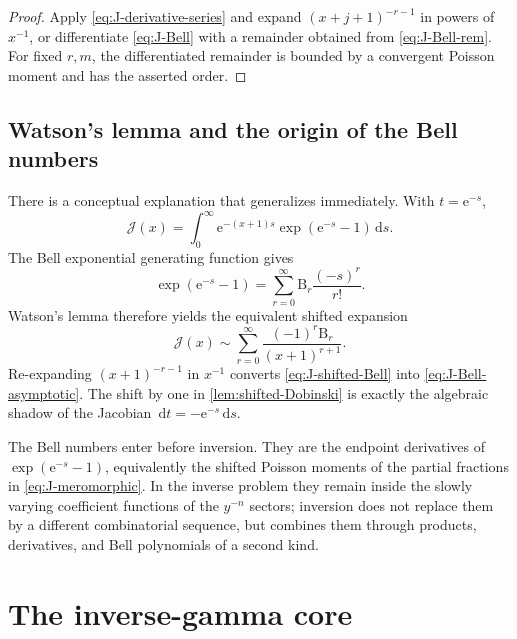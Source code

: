 \documentclass[11pt,a4paper]{article}
\numberwithin{equation}{section}
\theoremstyle{definition}
\theoremstyle{remark}
\newcommand{\e}{\mathrm e}
\newcommand{\dd}{\,\mathrm d}
\newcommand{\Bell}{\mathrm B}
\newcommand{\Tail}{\mathcal J}
\begin{document}
\begin{proof}
Apply \eqref{eq:J-derivative-series} and expand
$(x+j+1)^{-r-1}$ in powers of $x^{-1}$, or differentiate
\eqref{eq:J-Bell} with a remainder obtained from
\eqref{eq:J-Bell-rem}.  For fixed $r,m$, the differentiated remainder is
bounded by a convergent Poisson moment and has the asserted order.
\end{proof}

\subsection{Watson's lemma and the origin of the Bell numbers}

There is a conceptual explanation that generalizes immediately.  With
$t=\e^{-s}$,
\begin{equation}\label{eq:J-Laplace}
 \Tail(x)=\int_0^{\infty}\e^{-(x+1)s}
 \exp(\e^{-s}-1)\dd s.
\end{equation}
The Bell exponential generating function gives
\begin{equation}\label{eq:Bell-egf-minus}
 \exp(\e^{-s}-1)=\sum_{r=0}^{\infty}\Bell_r\frac{(-s)^r}{r!}.
\end{equation}
Watson's lemma therefore yields the equivalent shifted expansion
\begin{equation}\label{eq:J-shifted-Bell}
 \Tail(x)\sim\sum_{r=0}^{\infty}
 \frac{(-1)^r\Bell_r}{(x+1)^{r+1}}.
\end{equation}
Re-expanding $(x+1)^{-r-1}$ in $x^{-1}$ converts
\eqref{eq:J-shifted-Bell} into \eqref{eq:J-Bell-asymptotic}.  The shift by
one in \cref{lem:shifted-Dobinski} is exactly the algebraic shadow of the
Jacobian $\dd t=-\e^{-s}\dd s$.

\begin{summarybox}
The Bell numbers enter before inversion.  They are the endpoint derivatives
of $\exp(\e^{-s}-1)$, equivalently the shifted Poisson moments of the
partial fractions in \eqref{eq:J-meromorphic}.  In the inverse problem they
remain inside the slowly varying coefficient functions of the $y^{-n}$
sectors; inversion does not replace them by a different combinatorial
sequence, but combines them through products, derivatives, and Bell
polynomials of a second kind.
\end{summarybox}

\section{The inverse-gamma core}
\label{sec:inverse-gamma}
\end{document}
